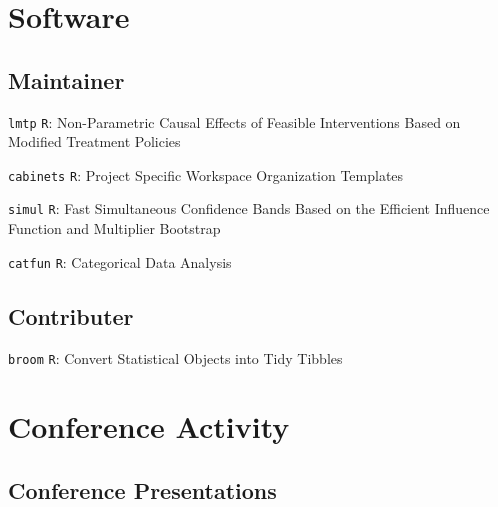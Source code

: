 \documentclass[12pt,letterpaper]{report}
\begin{document}
    \section*{Software}
    
    \subsection*{Maintainer}
    
    \begin{tablist}
    
    	\item[{\footnotesize \texttt{lmtp}}] \tab \texttt{R}: Non-Parametric Causal Effects of Feasible Interventions Based on Modified Treatment Policies
	
		\item[{\footnotesize \texttt{cabinets}}] \tab \texttt{R}: Project Specific Workspace Organization Templates
	
		\item[{\footnotesize \texttt{simul}}] \tab \texttt{R}: Fast Simultaneous Confidence Bands Based on the Efficient Influence Function and Multiplier Bootstrap
	
		\item[{\footnotesize \texttt{catfun}}] \tab \texttt{R}: Categorical Data Analysis
    
    \end{tablist}
    
    \subsection*{Contributer}
    
    \begin{tablist}
    
    	\item[{\footnotesize \texttt{broom}}] \tab \texttt{R}: Convert Statistical Objects into Tidy Tibbles
    
    \end{tablist}

    \section*{Conference Activity}

    \subsection*{Conference Presentations}
\end{document}
